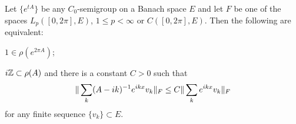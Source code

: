 \begin{thm} 
Let $\{e^{tA}\}$ be any $C_0$-semigroup on a Banach space $E$ and
let $F$ be one of the spaces
$L_p ([0,2\pi],E)$, $1\leq p < \infty$
or  $C([0,2\pi],E)$.
Then the following are equivalent:
\begin{list}{)}{}
\item $1\in \rho (e^{2\pi A})$;
\item $i{\Bbb{Z}} \subset \rho (A)$ and there is a constant $C>0$ such that
\begin{equation}
\|\sum_k (A-ik)^{-1}e^{ikx} v_k\|_F \leq C\| \sum_k
e^{ikx} v_k\|_F
\lb{G}
\end{equation}
for
any finite sequence $\{v_k\}\subset E$.
\end{list} \end{thm}

